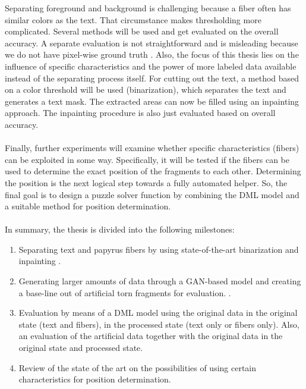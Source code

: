 \documentclass[12pt,a4paper]{article}
\begin{document}
Separating foreground and background is challenging because a fiber often has similar colors as the text. That circumstance makes thresholding more complicated. Several methods will be used and get evaluated on the overall accuracy. A separate evaluation is not straightforward and is misleading because we do not have pixel-wise ground truth \cite{Tensmeyer20}. Also, the focus of this thesis lies on the influence of specific characteristics and the power of more labeled data available instead of the separating process itself. For cutting out the text,  a method based on a color threshold will be used (binarization), which separates the text and generates a text mask. 
The extracted areas can now be filled using an inpainting \cite{Ballester00} approach. The inpainting procedure is also just evaluated based on overall accuracy. 
\\\\
Finally, further experiments will examine whether specific characteristics (fibers) can be exploited in some way. Specifically, it will be tested if the fibers can be used to determine the exact position of the fragments to each other. Determining the position is the next logical step towards a fully automated helper. So, the final goal is to design a puzzle solver function by combining the DML model and a suitable method for position determination. 
\\\\
In summary, the thesis is divided into the following milestones:

\begin{enumerate}[label=\bf{\Roman*.}]
	\item Separating text and papyrus fibers by using state-of-the-art binarization \cite{Tensmeyer20} and inpainting \cite{Liu18Impainting}.
	
	\item Generating larger amounts of data through a GAN-based model and creating a base-line out of artificial torn fragments for evaluation.  \cite{Goodfellow14, Tamrin21}.
	
	\item  Evaluation by means of a DML model using the original data in the original state (text and fibers), in the processed state (text only or fibers only). Also, an evaluation of the artificial data together with the original data in the original state and processed state.
	
	\item Review of the state of the art on the possibilities of using certain characteristics for position determination.      	      	      
\end{enumerate}
		
\end{document}
